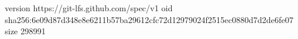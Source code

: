 version https://git-lfs.github.com/spec/v1
oid sha256:6e09d87d348e8e6211b57ba29612cfc72d12979024f2515ec0880d7d2de6fe07
size 298991

